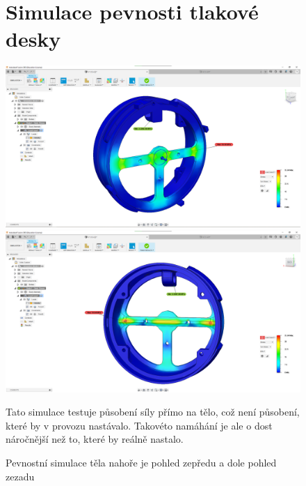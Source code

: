\begin{figure}
\section{Simulace pevnosti tlakové desky}
    \centering
    \includegraphics[width=370pt]{kapitoly/obrazky/E4/machanika_tlakove_desky/simulace/F100N,primo,uprostred,pohled_zepredu.png}
    \includegraphics[width=370pt]{kapitoly/obrazky/E4/machanika_tlakove_desky/simulace/F100N,primo,uprostred,pohled_zezadu.png}
    \caption{Pevnostní simulace těla nahoře je pohled zepředu a dole pohled zezadu \centering}
    Tato simulace testuje působení síly přímo na tělo, což není působení, které by v provozu nastávalo. Takovéto namáhání je ale o dost náročnější
    než to, které by reálně nastalo.
    \label{fig:E4-simulace_tela} %
\end{figure}

